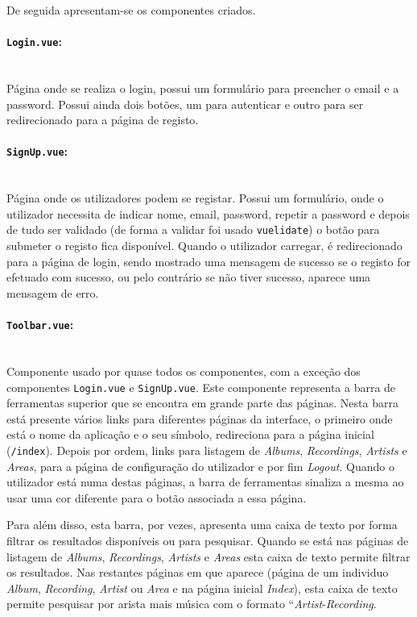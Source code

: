 \documentclass{article}
\begin{document}
\vspace{10px}

De seguida apresentam-se os componentes criados.

\paragraph{\texttt{Login.vue}:}\mbox{}\\

Página onde se realiza o login, possui um formulário para preencher o email e a password. Possui ainda dois botões, um para autenticar e outro para ser redirecionado para a página de registo.

\paragraph{\texttt{SignUp.vue}:}\mbox{}\\

Página onde os utilizadores podem se registar. Possui um formulário, onde o utilizador necessita de indicar nome, email, password, repetir a password e depois de tudo ser validado (de forma a validar foi usado \texttt{vuelidate}) o botão para submeter o registo fica disponível. Quando o utilizador carregar, é redirecionado para a página de login, sendo mostrado uma mensagem de sucesso se o registo for efetuado com sucesso, ou pelo contrário se não tiver sucesso, aparece uma mensagem de erro.

\paragraph{\texttt{Toolbar.vue}:}\mbox{}\\

Componente usado por quase todos os componentes, com a exceção dos componentes \texttt{Login.vue} e \texttt{SignUp.vue}. Este componente representa a barra de ferramentas superior que se encontra em grande parte das páginas. Nesta barra está presente vários links para diferentes páginas da interface, o primeiro onde está o nome da aplicação e o seu símbolo, redireciona para a página inicial (\texttt{/index}). Depois por ordem, links para listagem de \textit{Albums}, \textit{Recordings}, \textit{Artists} e \textit{Areas}, para a página de configuração do utilizador e por fim \textit{Logout}. Quando o utilizador está numa destas páginas, a barra de ferramentas sinaliza a mesma ao usar uma cor diferente para o botão associada a essa página.

Para além disso, esta barra, por vezes, apresenta uma caixa de texto por forma filtrar os resultados disponíveis ou para pesquisar. Quando se está nas páginas de listagem de \textit{Albums}, \textit{Recordings}, \textit{Artists} e \textit{Areas} esta caixa de texto permite filtrar os resultados. Nas restantes páginas em que aparece (página de um individuo \textit{Album}, \textit{Recording}, \textit{Artist} ou \textit{Area} e na página inicial \textit{Index}), esta caixa de texto permite pesquisar por arista mais música com o formato ``\textit{Artist}-\textit{Recording}.
\end{document}
